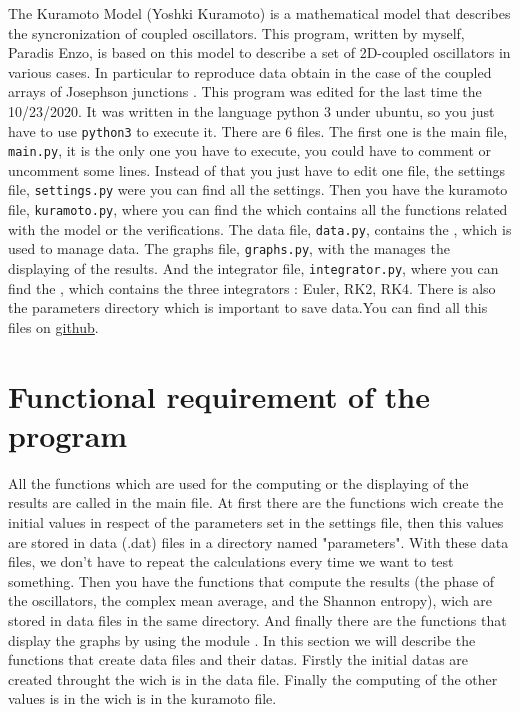\documentclass[1pt, a4paper]{article}
\begin{document}
\maketitlepage
\tableofcontents
\newpage
\noindent
The Kuramoto Model (Yoshki Kuramoto) is a mathematical model that describes the syncronization of coupled oscillators. This program, written by myself, Paradis Enzo, is based on this model to describe a set of 2D-coupled oscillators in various cases. In particular to reproduce data obtain in the case of the coupled arrays of Josephson junctions \cite{josephson}. This program was edited for the last time the 10/23/2020. It was written in the language python 3 under ubuntu, so you just have to use \texttt{python3} to execute it. There are 6 files. The first one is the main file, \texttt{main.py}, it is the only one you have to execute, you could have to comment or uncomment some lines. Instead of that you just have to edit one file, the settings file, \texttt{settings.py} were you can find all the settings. Then you have the kuramoto file, \texttt{kuramoto.py}, where you can find the  which contains all the functions related with the model or the verifications. The data file, \texttt{data.py}, contains the , which is used to manage data. The graphs file, \texttt{graphs.py}, with the  manages the displaying of the results. And the integrator file, \texttt{integrator.py}, where you can find the , which contains the three integrators : Euler, RK2, RK4. There is also the parameters directory which is important to save data.You can find all this files on \href{https://github.com/faucheresse/swimming_pool/tree/main/prog}{github}.
\section{Functional requirement of the program}
\label{sec:1}
\noindent
All the functions which are used for the computing or the displaying of the results are called in the main file. At first there are the functions wich create the initial values in respect of the parameters set in the settings file, then this values are stored in data (.dat) files in a directory named "parameters". With these data files, we don't have to repeat the calculations every time we want to test something. Then you have the functions that compute the results (the phase of the oscillators, the complex mean average, and the Shannon entropy), wich are stored in data files in the same directory. And finally there are the functions that display the graphs by using the module . In this section we will describe the functions that create data files and their datas. Firstly the initial datas are created throught the  wich is in the data file. Finally the computing of the other values is in the  wich is in the kuramoto file.
\end{document}
